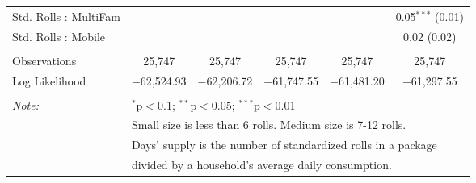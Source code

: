 \begin{table}[!htbp]
\begin{tabular}{@{\extracolsep{5pt}}lccccc}
  Std. Rolls : MultiFam &  &  &  &  & 0.05$^{***}$ (0.01) \\ 
  Std. Rolls : Mobile &  &  &  &  & 0.02 (0.02) \\ 
 \hline \\[-1.8ex] 
Observations & 25,747 & 25,747 & 25,747 & 25,747 & 25,747 \\ 
Log Likelihood & $-$62,524.93 & $-$62,206.72 & $-$61,747.55 & $-$61,481.20 & $-$61,297.55 \\ 
\hline 
\hline \\[-1.8ex] 
\textit{Note:}  & \multicolumn{5}{l}{$^{*}$p$<$0.1; $^{**}$p$<$0.05; $^{***}$p$<$0.01} \\ 
 & \multicolumn{5}{l}{Small size is less than 6 rolls. Medium size is 7-12 rolls. } \\ 
 & \multicolumn{5}{l}{Days' supply is the number of standardized rolls in a package} \\ 
 & \multicolumn{5}{l}{divided by a household's average daily consumption.} \\ 
\end{tabular} 
\end{table} 
